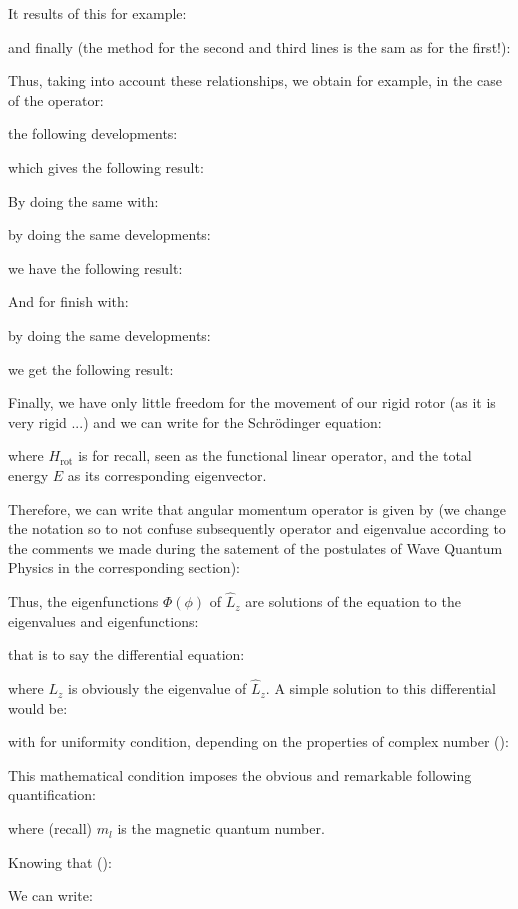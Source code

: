 	It results of this for example:
	
	and finally (the method for the second and third lines is the sam as for the first!):
	
	Thus, taking into account these relationships, we obtain for example, in the case of the operator:
	
	the following developments:
	
	which gives the following result:
	
	By doing the same with:
	
	by doing the same developments:
	
	we have the following result:
	
	And for finish with:
	
	by doing the same developments:
	
	we get the following result:
	
	Finally, we have only little freedom for the movement of our rigid rotor (as it is very rigid ...) and we can write for the Schrödinger equation:
	
	where $H_\text{rot}$ is for recall, seen as the functional linear operator, and the total energy $E$ as its corresponding eigenvector.

	Therefore, we can write that angular momentum operator is given by (we change the notation so to not confuse subsequently operator and eigenvalue according to the comments we made during the satement of the postulates of Wave Quantum Physics in the corresponding section):
	
	Thus, the eigenfunctions $\Phi(\phi)$ of $\hat{L}_z$ are solutions of the equation to the eigenvalues and eigenfunctions:
	
	that is to say the differential equation:
	
	where $L_z$ is obviously the eigenvalue of $\hat{L}_z$. A simple solution to this differential would be:
	
	with for uniformity condition, depending on the properties of complex number ():
	
	This mathematical condition imposes the obvious and remarkable following quantification:
	
	where (recall) $m_l$ is the magnetic quantum number.

	Knowing that ():
	
	We can write:
	
